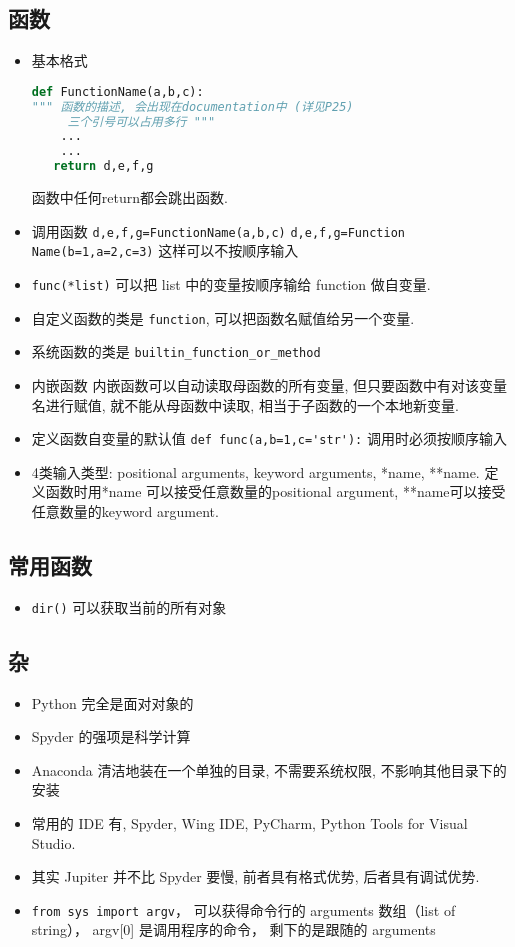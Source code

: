 \subsection{函数}
\begin{itemize}
\item 基本格式
\begin{lstlisting}[language=python]
def FunctionName(a,b,c):
""" 函数的描述, 会出现在documentation中 (详见P25)
     三个引号可以占用多行 """
    ...
    ...
   return d,e,f,g
\end{lstlisting}

函数中任何return都会跳出函数.

\item 调用函数
\verb`d,e,f,g=FunctionName(a,b,c)`
\verb`d,e,f,g=Function Name(b=1,a=2,c=3)`  这样可以不按顺序输入
\item \verb`func(*list)` 可以把 list 中的变量按顺序输给 function 做自变量.

\item 自定义函数的类是 \verb`function`, 可以把函数名赋值给另一个变量.
\item 系统函数的类是 \verb`builtin_function_or_method`

\item 内嵌函数
内嵌函数可以自动读取母函数的所有变量, 但只要函数中有对该变量名进行赋值, 就不能从母函数中读取, 相当于子函数的一个本地新变量.

\item 定义函数自变量的默认值  \verb`def func(a,b=1,c='str'):` 调用时必须按顺序输入
\item 4类输入类型: positional arguments, keyword arguments, *name, **name. 定义函数时用*name 可以接受任意数量的positional argument, **name可以接受任意数量的keyword argument.
\end{itemize}

\subsection{常用函数}
\begin{itemize}
\item \verb`dir()` 可以获取当前的所有对象
\end{itemize}

\subsection{杂}
\begin{itemize}
\item Python 完全是面对对象的
\item Spyder 的强项是科学计算
\item Anaconda 清洁地装在一个单独的目录, 不需要系统权限, 不影响其他目录下的安装
\item 常用的 IDE 有, Spyder, Wing IDE, PyCharm, Python Tools for Visual Studio.
\item 其实 Jupiter 并不比 Spyder 要慢, 前者具有格式优势, 后者具有调试优势.
\item \verb`from sys import argv`， 可以获得命令行的 arguments 数组（list of string）， argv[0] 是调用程序的命令， 剩下的是跟随的 arguments
\end{itemize}
